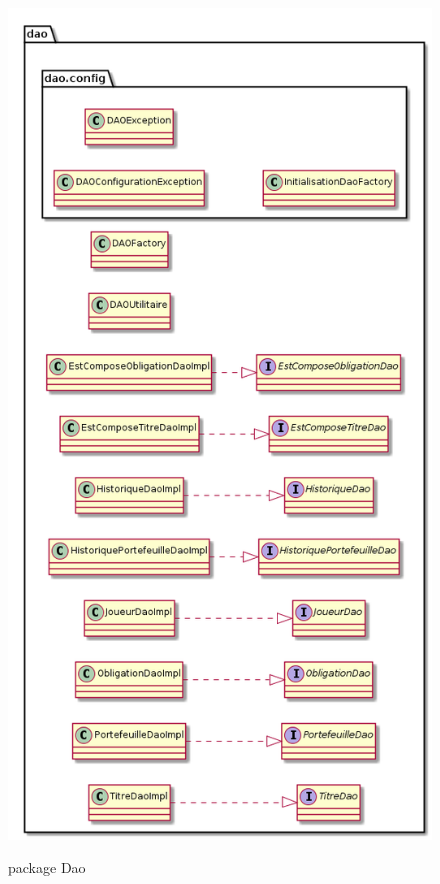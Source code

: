 \begin{figure}[H]
  \center
  \includegraphics[scale=0.25]{../graph/packageDAO.png} \\
  \caption{package Dao}
\end{figure}
